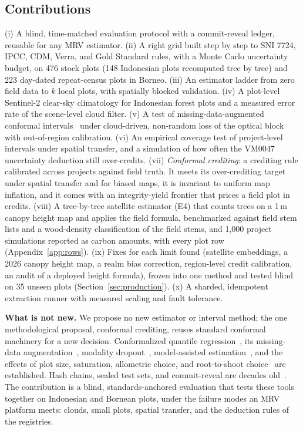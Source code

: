\documentclass[conference,a4paper]{IEEEtran}
\begin{document}
\subsection{Contributions}
(i) A blind, time-matched evaluation protocol with a commit-reveal ledger, reusable for any MRV estimator. (ii) A right grid built step by step to SNI 7724, IPCC, CDM, Verra, and Gold Standard rules, with a Monte Carlo uncertainty budget, on 476 stock plots (148 Indonesian plots recomputed tree by tree) and 223 day-dated repeat-census plots in Borneo. (iii) An estimator ladder from zero field data to $k$ local plots, with spatially blocked validation. (iv) A plot-level Sentinel-2 clear-sky climatology for Indonesian forest plots and a measured error rate of the scene-level cloud filter. (v) A test of missing-data-augmented conformal intervals~\cite{zaffran2023conformal} under cloud-driven, non-random loss of the optical block with out-of-region calibration. (vi) An empirical coverage test of project-level intervals under spatial transfer, and a simulation of how often the VM0047 uncertainty deduction still over-credits. (vii) \emph{Conformal crediting}: a crediting rule calibrated across projects against field truth. It meets its over-crediting target under spatial transfer and for biased maps, it is invariant to uniform map inflation, and it comes with an integrity-yield frontier that prices a field plot in credits. (viii) A tree-by-tree satellite estimator (E4) that counts trees on a 1\,m canopy height map and applies the field formula, benchmarked against field stem lists and a wood-density classification of the field stems, and 1{,}000 project simulations reported as carbon amounts, with every plot row (Appendix~\ref{app:rows}). (ix) Fixes for each limit found (satellite embeddings, a 2026 canopy height map, a realm bias correction, region-level credit calibration, an audit of a deployed height formula), frozen into one method and tested blind on 35 unseen plots (Section~\ref{sec:production}). (x) A sharded, idempotent extraction runner with measured scaling and fault tolerance.

\textbf{What is not new.} We propose no new estimator or interval method; the one methodological proposal, conformal crediting, reuses standard conformal machinery for a new decision. Conformalized quantile regression~\cite{romano2019cqr}, its missing-data augmentation~\cite{zaffran2023conformal}, modality dropout~\cite{neverova2016moddrop}, model-assisted estimation~\cite{sarndal1992model,stahl2016models}, and the effects of plot size, saturation, allometric choice, and root-to-shoot choice~\cite{rejou2014local,araza2022comprehensive,rutishauser2013generic,mokany2006critical} are established. Hash chains, sealed test sets, and commit-reveal are decades old~\cite{haber1991timestamp,blum1983coin,blum2015ladder}. The contribution is a blind, standards-anchored evaluation that tests these tools together on Indonesian and Bornean plots, under the failure modes an MRV platform meets: clouds, small plots, spatial transfer, and the deduction rules of the registries.
\end{document}
